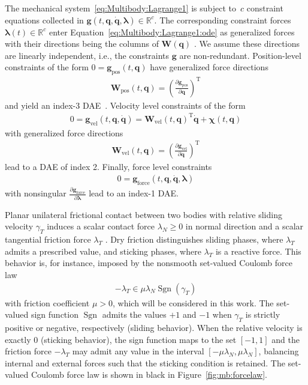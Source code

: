 \documentclass[a4paper, nonatbib, 3p, twocolumn]{elsarticle}
\theoremstyle{plain}
\theoremstyle{definition}
\theoremstyle{remark}
\newcommand{\pd}[2]{\frac{\partial #1}{\partial #2}}
\newcommand{\Sgn}{{\mathop{\mathrm{Sgn}}}}
\newcommand{\T}{^{\mathop{\mathrm{T}}}}
\newcommand{\Rspace}{\mathbb{R}}
\newcommand{\vla}{\bm{\lambda}}
\newcommand{\vch}{\bm{\chi}}
\newcommand{\vg}{\mathbf g}
\newcommand{\vq}{\mathbf q}
\newcommand{\vW}{\mathbf W}
\begin{document}
The mechanical system~\eqref{eq:Multibody:Lagrange1} is subject to~$c$ constraint equations collected in $\vg(t, \vq, \dot{\vq}, \vla) \in \Rspace^{c}$. The corresponding constraint forces $\vla(t)\in\Rspace^c$ enter Equation~\eqref{eq:Multibody:Lagrange1:ode} as generalized forces with their directions being the columns of $\vW(\vq)$ \cite{Kane1985}. We assume these directions are linearly independent, i.e., the constraints $\vg$ are non-redundant.
Position-level constraints of the form $0=\vg_{\mathrm{pos}}(t,\vq)$ have generalized force directions
\begin{align}
    \vW_{\mathrm{pos}}(t,\vq) = \left(\pd{\vg_{\mathrm{pos}}}{\vq}\right)\T
\end{align}
 and yield an index-3 DAE~\cite{Lamour2003}.
Velocity level constraints of the form
\begin{align}
    0 = \vg_{\mathrm{vel}}(t, \vq, \dot{\vq}) = \vW_{\mathrm{vel}}(t, \vq)\T \dot{\vq} + \vch(t, \vq)
\end{align}
with generalized force directions 
\begin{align}
    \vW_{\mathrm{vel}}(t,\vq) = \left(\pd{\vg_{\mathrm{vel}}}{\dot{\vq}}\right)\T
\end{align}
lead to a DAE of index 2.
Finally, force level constraints
\begin{align}
    0 = \vg_{\mathrm{force}}(t, \vq, \dot{\vq}, \vla)
\end{align}
with nonsingular $\pd{\vg_{\mathrm{force}}}{\vla}$ lead to an index-1 DAE. 

Planar unilateral frictional contact between two bodies with relative sliding velocity $\gamma_T$ induces a scalar contact force $\lambda_N \geq 0$ in normal direction and a scalar tangential friction force $\lambda_T$ \cite{Glocker2001}.
Dry friction distinguishes sliding phases, where $\lambda_T$ admits a prescribed value, and sticking phases, where $\lambda_T$ is a reactive force.
This behavior is, for instance, imposed by the nonsmooth set-valued Coulomb force law
\begin{align}\label{eq:Multibody:Inclusionlaw}
    - \lambda_{T} \in \mu\lambda_{N}\Sgn(\gamma_{T})
\end{align}
with friction coefficient $\mu > 0$, which will be considered in this work.
The set-valued sign function $\Sgn$ admits the values $+1$ and $-1$ when $\gamma_T$ is strictly positive or negative, respectively (sliding behavior).
When the relative velocity is exactly $0$ (sticking behavior), the sign function maps to the set $[-1, 1]$ and the friction force $-\lambda_T$ may admit any value in the interval $[-\mu \lambda_N, \mu \lambda_N]$, balancing internal and external forces such that the sticking condition is retained. The set-valued Coulomb force law is shown in black in Figure~\ref{fig:mb:forcelaw}. 
\end{document}
